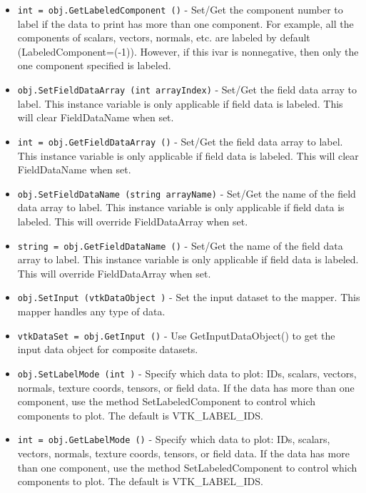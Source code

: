 \begin{itemize}
\item  \verb|int = obj.GetLabeledComponent ()| -  Set/Get the component number to label if the data to print has
 more than one component. For example, all the components of
 scalars, vectors, normals, etc. are labeled by default
 (LabeledComponent=(-1)). However, if this ivar is nonnegative,
 then only the one component specified is labeled.

\item  \verb|obj.SetFieldDataArray (int arrayIndex)| -  Set/Get the field data array to label. This instance variable is
 only applicable if field data is labeled.  This will clear
 FieldDataName when set.

\item  \verb|int = obj.GetFieldDataArray ()| -  Set/Get the field data array to label. This instance variable is
 only applicable if field data is labeled.  This will clear
 FieldDataName when set.

\item  \verb|obj.SetFieldDataName (string arrayName)| -  Set/Get the name of the field data array to label.  This instance
 variable is only applicable if field data is labeled.  This will
 override FieldDataArray when set.

\item  \verb|string = obj.GetFieldDataName ()| -  Set/Get the name of the field data array to label.  This instance
 variable is only applicable if field data is labeled.  This will
 override FieldDataArray when set.

\item  \verb|obj.SetInput (vtkDataObject )| -  Set the input dataset to the mapper. This mapper handles any type of data.

\item  \verb|vtkDataSet = obj.GetInput ()| -  Use GetInputDataObject() to get the input data object for composite
 datasets.

\item  \verb|obj.SetLabelMode (int )| -  Specify which data to plot: IDs, scalars, vectors, normals, texture coords,
 tensors, or field data. If the data has more than one component, use
 the method SetLabeledComponent to control which components to plot.
 The default is VTK\_LABEL\_IDS.

\item  \verb|int = obj.GetLabelMode ()| -  Specify which data to plot: IDs, scalars, vectors, normals, texture coords,
 tensors, or field data. If the data has more than one component, use
 the method SetLabeledComponent to control which components to plot.
 The default is VTK\_LABEL\_IDS.


\end{itemize}
